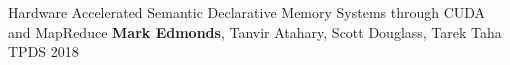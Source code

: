 


\begin{cvpublications}

\item \cvpublication
{Hardware Accelerated Semantic Declarative Memory Systems through CUDA and MapReduce} %
{\textbf{Mark Edmonds}, Tanvir Atahary, Scott Douglass, Tarek Taha} %
{TPDS 2018} %
{} %

\end{cvpublications}